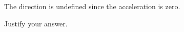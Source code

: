 \documentclass{../../../oss-apphys}
\begin{document}
\begin{enumerate}
\begin{enumerate}
    \vspace{.1in}\underline{\hspace{.3in}} The direction is undefined since the
    acceleration is zero.

    \vspace{.1in}Justify your answer.
  \end{enumerate}
  
   
%  
  \newpage
  

\end{enumerate}
\end{document}
